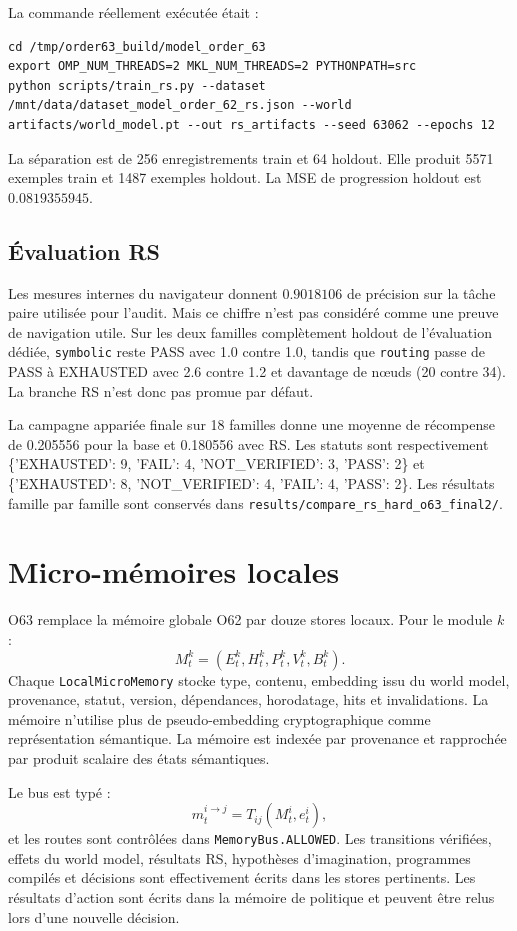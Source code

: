 \documentclass[11pt,a4paper]{article}
\newcommand{\code}[1]{\texttt{#1}}
\begin{document}
La commande réellement exécutée était :
\begin{lstlisting}
cd /tmp/order63_build/model_order_63
export OMP_NUM_THREADS=2 MKL_NUM_THREADS=2 PYTHONPATH=src
python scripts/train_rs.py --dataset /mnt/data/dataset_model_order_62_rs.json --world artifacts/world_model.pt --out rs_artifacts --seed 63062 --epochs 12
\end{lstlisting}
La séparation est de 256 enregistrements train et 64 holdout. Elle produit 5571 exemples train et 1487 exemples holdout. La MSE de progression holdout est $0.0819355945$.

\subsection{Évaluation RS}
Les mesures internes du navigateur donnent $0.9018106$ de précision sur la tâche paire utilisée pour l’audit. Mais ce chiffre n’est pas considéré comme une preuve de navigation utile. Sur les deux familles complètement holdout de l’évaluation dédiée, \code{symbolic} reste PASS avec 1.0 contre 1.0, tandis que \code{routing} passe de PASS à EXHAUSTED avec 2.6 contre 1.2 et davantage de nœuds (20 contre 34). La branche RS n’est donc pas promue par défaut.

La campagne appariée finale sur 18 familles donne une moyenne de récompense de 0.205556 pour la base et 0.180556 avec RS. Les statuts sont respectivement \{'EXHAUSTED': 9, 'FAIL': 4, 'NOT\_VERIFIED': 3, 'PASS': 2\} et \{'EXHAUSTED': 8, 'NOT\_VERIFIED': 4, 'FAIL': 4, 'PASS': 2\}. Les résultats famille par famille sont conservés dans \code{results/compare\_rs\_hard\_o63\_final2/}.

\section{Micro-mémoires locales}
O63 remplace la mémoire globale O62 par douze stores locaux. Pour le module $k$ :
\[
M_t^k=(E_t^k,H_t^k,P_t^k,V_t^k,B_t^k).
\]
Chaque \code{LocalMicroMemory} stocke type, contenu, embedding issu du world model, provenance, statut, version, dépendances, horodatage, hits et invalidations. La mémoire n’utilise plus de pseudo-embedding cryptographique comme représentation sémantique. La mémoire est indexée par provenance et rapprochée par produit scalaire des états sémantiques.

Le bus est typé :
\[
m_t^{i\to j}=T_{ij}(M_t^i,e_t^i),
\]
et les routes sont contrôlées dans \code{MemoryBus.ALLOWED}. Les transitions vérifiées, effets du world model, résultats RS, hypothèses d’imagination, programmes compilés et décisions sont effectivement écrits dans les stores pertinents. Les résultats d’action sont écrits dans la mémoire de politique et peuvent être relus lors d’une nouvelle décision.
\end{document}
